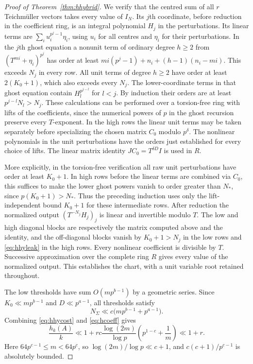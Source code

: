 \documentclass[11pt,letterpaper]{article}
\theoremstyle{definition}
\numberwithin{equation}{section}
\begin{document}
\begin{proof}[Proof of Theorem~\ref{thm:hhybrid}]
We verify that the centred sum of all $r$ Teichm\"uller vectors
takes every value of $I_N$. Its $j$th coordinate, before reduction
in the coefficient ring, is an integral polynomial $H_j$ in the
perturbations. Its linear terms are $\sum_i u_i^{p^j-1}\eta_i$,
using $u_i$ for all centres and $\eta_i$ for their perturbations.
In the $j$th ghost equation a nonunit term of ordinary degree $h\ge2$
from $(T^{mi}+\eta_i)^{p^j}$ has order at least
$mi(p^j-1)+n_i+(h-1)(n_i-mi)$. This exceeds $N_j$ in every row.
All unit terms of degree $h\ge2$ have order at least $2(K_0+1)$,
which also exceeds every $N_j$. The lower-coordinate terms in that
ghost equation contain $H_l^{p^{j-l}}$ for $l<j$. By induction
their orders are at least $p^{j-l}N_l>N_j$. These calculations can
be performed over a torsion-free ring with lifts of the coefficients,
since the numerical powers of $p$ in the ghost recursion
preserve every $T$-exponent. In the high rows the linear unit
terms may be taken separately before specializing the chosen matrix
$C_0$ modulo $p^\delta$. The nonlinear polynomials in the unit perturbations have the
orders just established for every choice of lifts. The linear
matrix identity $JC_0=T^{\delta D}I$ is used in $R$.

More explicitly, in the torsion-free verification all raw unit
perturbations have order at least $K_0+1$. In high rows before the
linear terms are combined via $C_0$, this suffices
to make the lower ghost powers vanish to order greater than $N_*$,
since $p(K_0+1)>N_*$. Thus the preceding induction uses only
the lift-independent bound $K_0+1$ for these intermediate rows.
After reduction the normalized output $(T^{-N_j}H_j)_j$ is
linear and invertible modulo $T$. The low and high diagonal blocks
are respectively the matrix computed above and the identity, and
the off-diagonal blocks vanish by $K_0+1>N_j$ in the low rows and
\eqref{eq:hhyleak} in the high rows. Every nonlinear coefficient
is divisible by $T$. Successive approximation over the complete
ring $R$ gives every value of the normalized output. This establishes
the chart, with a unit variable root retained throughout.

The low thresholds have sum $O(mp^{b-1})$ by a geometric series.
Since $K_0\ll mp^{b-1}$ and $D\ll p^{a-1}$, all thresholds satisfy
\[
              N_\Sigma\ll c\bigl(mp^{b-1}+p^{a-1}\bigr).
\]
Combining \eqref{eq:hhycost} and \eqref{eq:hcoeff} gives
\[
 \frac{h_k(A)}{k}\ll
       1+r c\frac{\log(2m)}{\log p}
                    \left(p^{1-c}+\frac1m\right)\ll 1+r .
\]
Here $64p^{c-1}\le m<64p^c$, so $\log(2m)/\log p\ll c+1$,
and $c(c+1)/p^{c-1}$ is absolutely bounded.


\end{proof}
\end{document}
